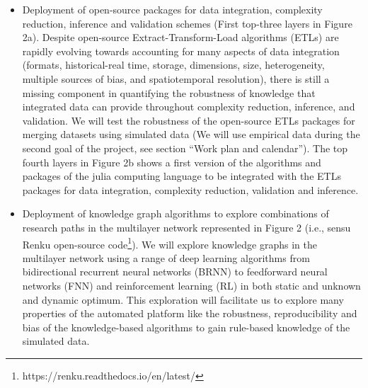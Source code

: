\documentclass[authoryear,1p,12pt]{elsarticle}
\begin{document}
     \begin{itemize}
     \item Deployment of open-source packages for data integration,
       complexity reduction, inference and validation schemes (First
       top-three layers in Figure 2a). Despite open-source
       Extract-Transform-Load algorithms (ETLs) are rapidly evolving
       towards accounting for many aspects of data integration
       (formats, historical-real time, storage, dimensions, size,
       heterogeneity, multiple sources of bias, and spatiotemporal
       resolution), there is still a missing component in quantifying
       the robustness of knowledge that integrated data can provide
       throughout complexity reduction, inference, and validation. We
       will test the robustness of the open-source ETLs packages for
       merging datasets using simulated data (We will use empirical
       data during the second goal of the project, see section ``Work
       plan and calendar''). The top fourth layers in Figure 2b shows
       a first version of the algorithms and packages of the julia
       computing language to be integrated with the ETLs packages for
       data integration, complexity reduction, validation and
       inference.
     \item Deployment of knowledge graph algorithms
       \citep{Bonattietal:2018} to explore combinations of research
       paths in the multilayer network represented in Figure 2 (i.e.,
       sensu Renku open-source
       code\footnote{https://renku.readthedocs.io/en/latest/}). We
       will explore knowledge graphs in the multilayer network using a
       range of deep learning algorithms from bidirectional recurrent
       neural networks (BRNN) to feedforward neural networks (FNN) and
       reinforcement learning (RL) in both static and unknown and
       dynamic optimum\citep{Schmidhuber:2015}. This exploration will
       facilitate us to explore many properties of the automated
       platform like the robustness, reproducibility and bias of the
       knowledge-based algorithms to gain rule-based knowledge of the
       simulated data.
     \end{itemize}
     
\end{document}
